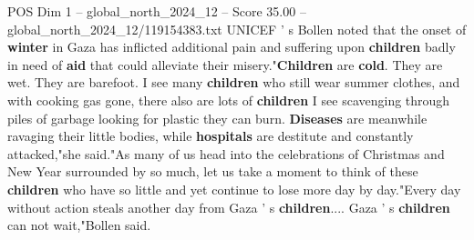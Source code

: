\begin{textsample}{POS Dim 1 – global\_north\_2024\_12 – Score 35.00 – global\_north\_2024\_12/119154383.txt}
UNICEF ' s Bollen noted that the onset of \textbf{winter} in Gaza has inflicted additional pain and suffering upon \textbf{children} badly in need of \textbf{aid} that could alleviate their misery."\textbf{Children} are \textbf{cold}.
They are wet.
They are barefoot.
I see many \textbf{children} who still wear summer clothes, and with cooking gas gone, there also are lots of \textbf{children} I see scavenging through piles of garbage looking for plastic they can burn. \textbf{Diseases} are meanwhile ravaging their little bodies, while \textbf{hospitals} are destitute and constantly attacked,"she said."As many of us head into the celebrations of Christmas and New Year surrounded by so much, let us take a moment to think of these \textbf{children} who have so little and yet continue to lose more day by day."Every day without action steals another day from Gaza ' s \textbf{children}....
Gaza ' s \textbf{children} can not wait,"Bollen said.

\end{textsample}
